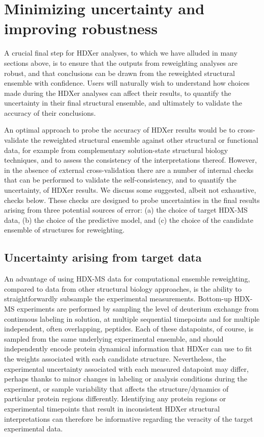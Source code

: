 \documentclass[9pt,tutorial]{livecoms}
\begin{document}
\section{Minimizing uncertainty and improving robustness}\label{robustness_sect}

A crucial final step for HDXer analyses, to which we have alluded in many sections above, is to ensure that the outputs from reweighting analyses are robust, and that conclusions can be drawn from the reweighted structural ensemble with confidence.
Users will naturally wish to understand how choices made during the HDXer analyses can affect their results, to quantify the uncertainty in their final structural ensemble, and ultimately to validate the accuracy of their conclusions.

An optimal approach to probe the accuracy of HDXer results would be to cross-validate the reweighted structural ensemble against other structural or functional data, for example from complementary solution-state structural biology techniques, and to assess the consistency of the interpretations thereof.
However, in the absence of external cross-validation there are a number of internal checks that can be performed to validate the self-consistency, and to quantify the uncertainty, of HDXer results.
We discuss some suggested, albeit not exhaustive, checks below.
These checks are designed to probe uncertainties in the final results arising from three potential sources of error: (a) the choice of target HDX-MS data, (b) the choice of the predictive model, and (c) the choice of the candidate ensemble of structures for reweighting.

\subsection{Uncertainty arising from target data}\label{target_data_uncertainty_sect}
An advantage of using HDX-MS data for computational ensemble reweighting, compared to data from other structural biology approaches, is the ability to straightforwardly subsample the experimental measurements.
Bottom-up HDX-MS experiments are performed by sampling the level of deuterium exchange from continuous labeling in solution, at multiple sequential timepoints and for multiple independent, often overlapping, peptides.
Each of these datapoints, of course, is sampled from the same underlying experimental ensemble, and should independently encode protein dynamical information that HDXer can use to fit the weights associated with each candidate structure.
Nevertheless, the experimental uncertainty associated with each measured datapoint may differ, perhaps thanks to minor changes in labeling or analysis conditions during the experiment, or sample variability that affects the structure/dynamics of particular protein regions differently.
Identifying any protein regions or experimental timepoints that result in inconsistent HDXer structural interpretations can therefore be informative regarding the veracity of the target experimental data.
\end{document}
